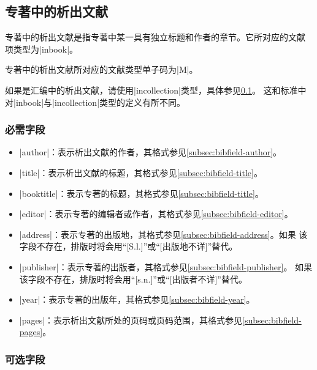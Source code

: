 \subsection{专著中的析出文献}\label{subsec:bibtype-incollection}

专著中的析出文献是指专著中某一具有独立标题和作者的章节。它所对应的{\BibTeX}文献
项类型为|inbook|。

专著中的析出文献所对应的文献类型\cite{gbt3469-1983}单子码为|M|。

\begin{note}
如果是汇编中的析出文献，请使用|incollection|类型，具体参见\ref{subsec:bibtype-incollection}。
这和标准{\BibTeX}中对|inbook|与|incollection|类型的定义有所不同。
\end{note}

\subsubsection{必需字段}

\begin{itemize}
\item |author|：表示析出文献的作者，其格式参见\ref{subsec:bibfield-author}。
\item |title|：表示析出文献的标题，其格式参见\ref{subsec:bibfield-title}。
\item |booktitle|：表示专著的标题，其格式参见\ref{subsec:bibfield-title}。
\item |editor|：表示专著的编辑者或作者，其格式参见\ref{subsec:bibfield-editor}。
\item |address|：表示专著的出版地，其格式参见\ref{subsec:bibfield-address}。如果
  该字段不存在，{\BibTeX}排版时将会用``[S.l.]''或``[出版地不详]''替代。
\item |publisher|：表示专著的出版者，其格式参见\ref{subsec:bibfield-publisher}。
  如果该字段不存在，{\BibTeX}排版时将会用``[s.n.]''或``[出版者不详]''替代。
\item |year|：表示专著的出版年，其格式参见\ref{subsec:bibfield-year}。
\item |pages|：表示析出文献所处的页码或页码范围，其格式参见\ref{subsec:bibfield-pages}。
\end{itemize}

\subsubsection{可选字段}

